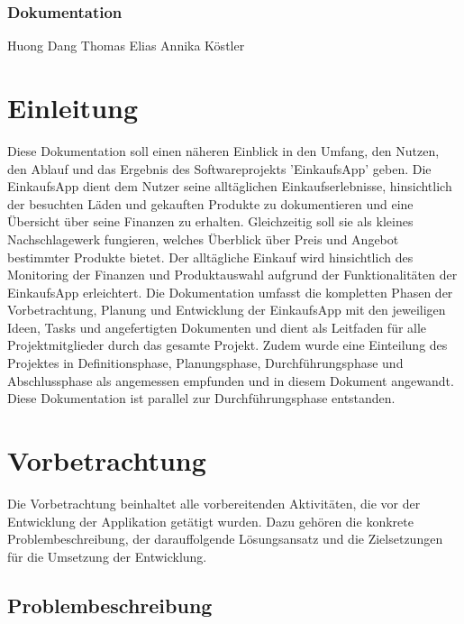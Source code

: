 \documentclass[12pt,a4paper]{article}
\begin{document}
\subsubsection*{Dokumentation}
Huong Dang
\newline
Thomas Elias
\newline
Annika Köstler
\newpage


\section*{Einleitung}
Diese Dokumentation soll einen näheren Einblick in den Umfang, den Nutzen, den Ablauf und das Ergebnis des Softwareprojekts 'EinkaufsApp' geben.  
\newline
Die EinkaufsApp dient dem Nutzer seine alltäglichen Einkaufserlebnisse, hinsichtlich der besuchten Läden und gekauften Produkte zu dokumentieren und eine Übersicht über seine Finanzen zu erhalten.
Gleichzeitig soll sie als kleines Nachschlagewerk fungieren, welches Überblick über Preis und Angebot bestimmter Produkte bietet.
Der alltägliche Einkauf wird hinsichtlich des Monitoring der Finanzen und Produktauswahl aufgrund der Funktionalitäten der EinkaufsApp erleichtert.
\newline
Die Dokumentation umfasst die kompletten Phasen der Vorbetrachtung, Planung und Entwicklung der EinkaufsApp mit den jeweiligen Ideen, Tasks und angefertigten Dokumenten und dient als Leitfaden für alle Projektmitglieder durch das gesamte Projekt.
\newline
Zudem wurde eine Einteilung des Projektes in Definitionsphase, Planungsphase, Durchführungsphase und Abschlussphase als angemessen empfunden und in diesem Dokument angewandt.
Diese Dokumentation ist parallel zur Durchführungsphase entstanden.

\newpage
\section{Vorbetrachtung}
Die Vorbetrachtung beinhaltet alle vorbereitenden Aktivitäten, die vor der Entwicklung der Applikation getätigt wurden. Dazu gehören die konkrete Problembeschreibung, der darauffolgende Lösungsansatz und die Zielsetzungen für die Umsetzung der Entwicklung.


\subsection{Problembeschreibung}
\end{document}
